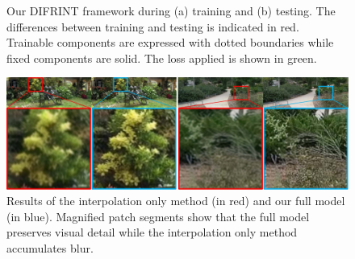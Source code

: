 \begin{figure}
	\centering
	\vspace{-2mm}
	\caption{Our DIFRINT framework during (a) training and (b) testing. 
	The differences between training and testing is indicated in red. 
	Trainable components are expressed with dotted boundaries while fixed components are solid.
	The loss applied is shown in green.}
	\label{framework}
\end{figure}

\begin{figure}
	\includegraphics[width=1\linewidth,keepaspectratio]{blur}
	\caption{Results of the interpolation only method (in red) and our full model (in blue).
	Magnified patch segments show that the full model preserves visual detail while the interpolation only method accumulates blur.}
	\label{blur}
\end{figure}

